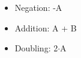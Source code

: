 \begin{itemize}
  \item Negation: -A
  \item Addition: A + B
  \item Doubling: 2$\cdot$A
\end{itemize}

